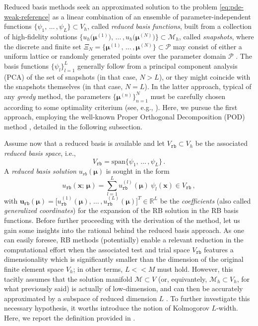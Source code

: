 \documentclass[12pt, a4paper, twoside, openright]{report}
\numberwithin{equation}{chapter}
\theoremstyle{theorem}
\theoremstyle{definition}
\theoremstyle{remark}
\theoremstyle{proposition}
\numberwithin{figure}{chapter}
\newcommand{\bg}[1]{\boldsymbol{#1}}
\begin{document}
		Reduced basis methods seek an approximated solution to the problem \eqref{eq:pde-weak-reference} as a linear combination of an ensemble of parameter-independent functions $\big\lbrace \psi_1, \, \ldots \, , \psi_L \big\rbrace \subset V_h$, called \emph{reduced basis functions}, built from a collection of high-fidelity solutions $\big\lbrace u_h \big( \bg{\mu}^{(1)} \big), \, \ldots \, , u_h \big( \bg{\mu}^{(N)} \big) \big\rbrace \subset \mathcal{M}_h$, called \emph{snapshots}, where the discrete and finite set $\Xi_N = \big\lbrace \bg{\mu}^{(1)}, \, \ldots \, , \bg{\mu}^{(N)} \big\rbrace \subset \mathcal{P}$ may consist of either a uniform lattice or randomly generated points over the parameter domain $\mathcal{P}$ \cite{HSR16}. The basis functions $\big\lbrace \psi_l \big\rbrace_{l = 1}^L$ generally follow from a principal component analysis (PCA) of the set of snapshots (in that case, $N > L$), or they might coincide with the snapshots themselves (in that case, $N = L$). In the latter approach, typical of any \emph{greedy} method, the parameters $\big\lbrace \bg{\mu}^{(n)} \big\rbrace_{n = 1}^N$ must be carefully chosen according to some optimality criterium (see, e.g., \cite{Chen17}). Here, we pursue the first approach, employing the well-known Proper Orthogonal Decomposition (POD) method \cite{Vol08}, detailed in the following subsection.
		
		Assume now that a reduced basis is available and let $V_{\texttt{rb}} \subset V_h$ be the associated \emph{reduced basis space}, i.e.,
		\begin{equation*}
			V_{\texttt{rb}} = \text{span} \big\lbrace \psi_1, \, \ldots \, , \psi_L \big\rbrace \, .
		\end{equation*} 
		A \emph{reduced basis solution} $u_{rb}(\bg{\mu})$ is sought in the form
		\begin{equation}
			\label{eq:rb-solution}
			u_{\texttt{rb}}(\bg{x}; \, \bg{\mu}) = \sum_{l = 1}^L u_{\texttt{rb}}^{(l)}(\bg{\mu}) ~ \psi_l(\bg{x}) \in V_{\texttt{rb}} \, ,
		\end{equation}
		with $\mathbf{u}_{\texttt{rb}}(\bg{\mu}) = \big[ u_{\texttt{rb}}^{(1)}(\bg{\mu}), \, \ldots \, , u_{\texttt{rb}}^{(L)}(\bg{\mu}) \big]^T \in \mathbb{R}^L$ be the \emph{coefficients} (also called \emph{generalized coordinates}) for the expansion of the RB solution in the RB basis functions. Before further proceeding with the derivation of the method, let us gain some insights into the rational behind the reduced basis approach. As one can easily foresee, RB methods (potentially) enable a relevant reduction in the computational effort when the associated test and trial space $V_{\texttt{rb}}$ features a dimensionality which is significantly smaller than the dimension of the original finite element space $V_h$; in other terms, $L << M$ must hold. However, this tacitly assumes that the solution manifold $\mathcal{M} \subset V$ (or, equivantely, $\mathcal{M}_h \subset V_h$, for what previously said) is actually of low-dimension, and can then be accurately approximated by a subspace of reduced dimension $L$ \cite{HSR16}. To further investigate this necessary hypothesis, it worths introduce the notion of Kolmogorov $L$-width. Here, we report the definition provided in \cite{Mad06}.
		
\end{document}
